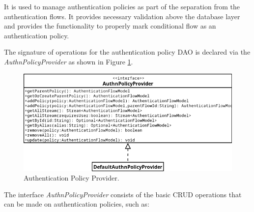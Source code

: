 It is used to manage authentication policies as part of the separation from the authentication flows.
It provides necessary validation above the database layer and provides the functionality to properly mark conditional flow as an authentication policy.

The signature of operations for the authentication policy DAO is declared via the \textit{AuthnPolicyProvider} as shown in Figure \ref{fig:impl-authn-policies-provider-diagram}.

\begin{figure}[htbp]
  \centering
  \includegraphics[width=1\textwidth]{img/sections/6-implementation/authn-policy-provider-diagram.png}
  \caption{Authentication Policy Provider.}
  \label{fig:impl-authn-policies-provider-diagram}
\end{figure}

\newpage

The interface \textit{AuthnPolicyProvider} consists of the basic CRUD operations that can be made on authentication policies, such as:

